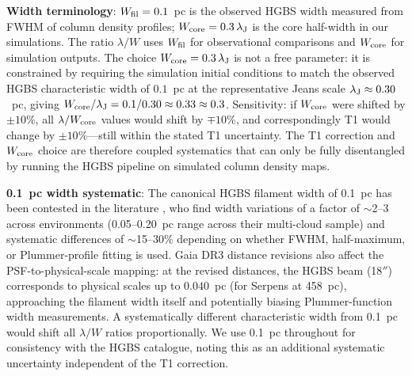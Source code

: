 \documentclass[twoside,twocolumn]{mnras}
\begin{document}
\textbf{Width terminology}: $W_{\rm fil} = 0.1$~pc is the observed HGBS width measured
from FWHM of column density profiles; $W_{\rm core} = 0.3\,\lambda_{\rm J}$ is the
core half-width in our simulations. The ratio $\lambda/W$ uses $W_{\rm fil}$ for observational comparisons and $W_{\rm core}$ for simulation outputs. The choice $W_{\rm core} = 0.3\,\lambda_{\rm J}$ is not a free parameter: it is constrained by requiring the simulation initial conditions to match the observed HGBS characteristic width of $0.1$~pc at the representative Jeans scale $\lambda_{\rm J} \approx 0.30$~pc, giving $W_{\rm core}/\lambda_{\rm J} = 0.1/0.30 \approx 0.33 \approx 0.3$. Sensitivity: if $W_{\rm core}$ were shifted by $\pm 10\%$, all $\lambda/W_{\rm core}$ values would shift by $\mp 10\%$, and correspondingly T1 would change by $\pm 10\%$---still within the stated T1 uncertainty. The T1 correction and $W_{\rm core}$ choice are therefore coupled systematics that can only be fully disentangled by running the HGBS pipeline on simulated column density maps.

\textbf{0.1~pc width systematic}: The canonical HGBS filament width of 0.1~pc has been
contested in the literature \citep{Panopoulou2022}, who find width variations of a factor of $\sim$2--3 across environments (0.05--0.20~pc range across their multi-cloud sample) and systematic differences of $\sim$15--30\% depending on whether FWHM, half-maximum, or Plummer-profile fitting is used. Gaia DR3 distance revisions also affect the PSF-to-physical-scale
mapping: at the revised distances, the HGBS beam (18$''$) corresponds to physical scales
up to $0.040$~pc (for Serpens at 458~pc), approaching the filament width itself and
potentially biasing Plummer-function width measurements. A systematically different
characteristic width from 0.1~pc would shift all $\lambda/W$ ratios proportionally.
We use 0.1~pc throughout for consistency with the HGBS catalogue, noting this as an
additional systematic uncertainty independent of the T1 correction.
\end{document}
